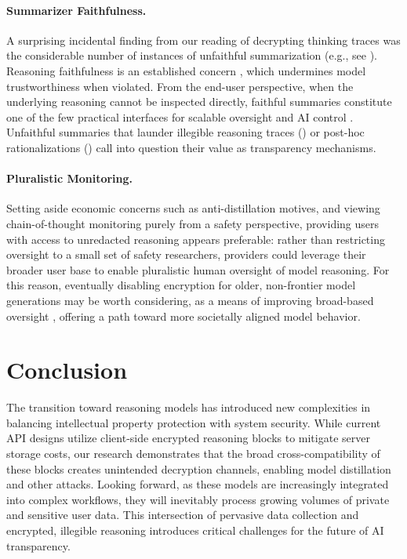 \paragraph{Summarizer Faithfulness.} A surprising incidental finding from our reading of decrypting thinking traces was the considerable number of instances of unfaithful summarization (e.g., see ). Reasoning faithfulness is an established concern \citep{lanham_measuring_2023}, which undermines model trustworthiness when violated. From the end-user perspective, when the underlying reasoning cannot be inspected directly, faithful summaries constitute one of the few practical interfaces for scalable oversight and AI control \citep{greenblatt2024aicontrolimprovingsafety}. Unfaithful summaries that launder illegible reasoning traces () or post-hoc rationalizations () call into question their value as transparency mechanisms.

 \paragraph{Pluralistic Monitoring.} Setting aside economic concerns such as anti-distillation motives, and viewing chain-of-thought monitoring purely from a safety perspective, providing users with access to unredacted reasoning appears preferable: rather than restricting oversight to a small set of safety researchers, providers could leverage their broader user base to enable pluralistic human oversight of model reasoning. For this reason, eventually disabling encryption for older, non-frontier model generations may be worth considering, as a means of improving broad-based oversight \citep{korbak_chain_2025}, offering a path toward more societally aligned model behavior.%

\section{Conclusion}
The transition toward reasoning models has introduced new complexities in balancing intellectual property protection with system security. While current API designs utilize client-side encrypted reasoning blocks to mitigate server storage costs, our research demonstrates that the broad cross-compatibility of these blocks creates unintended decryption channels, enabling model distillation and other attacks. Looking forward, as these models are increasingly integrated into complex workflows, they will inevitably process growing volumes of private and sensitive user data. This intersection of pervasive data collection and encrypted, illegible reasoning introduces critical challenges for the future of AI transparency. 

